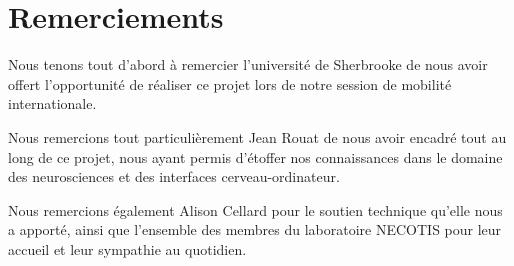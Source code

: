 \chapter*{Remerciements}
\thispagestyle{fancy}

Nous tenons tout d'abord à remercier l'université de Sherbrooke de nous avoir offert l'opportunité de réaliser ce projet lors de notre session de mobilité internationale.

Nous remercions tout particulièrement Jean Rouat de nous avoir encadré tout au long de ce projet, nous ayant permis d'étoffer nos connaissances dans le domaine des neurosciences et des interfaces cerveau-ordinateur.

Nous remercions également Alison Cellard pour le soutien technique qu'elle nous a apporté, ainsi que l'ensemble des membres du laboratoire NECOTIS pour leur accueil et leur sympathie au quotidien. 